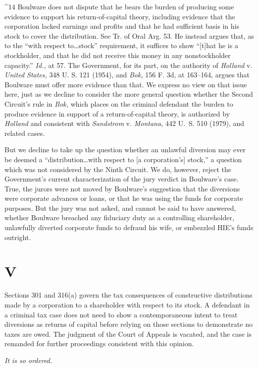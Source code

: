 ^14 Boulware does not dispute that he bears the burden of producing
some evidence to support his return-of-capital theory, including
evidence that the corporation lacked earnings and profits and that he
had sufficient basis in his stock to cover the distribution. See Tr.
of Oral Arg. 53. He instead argues that, as to the ``with respect
to\dots stock'' requirement, it suffices to show ``[t]hat he
is a stockholder, and that he did not receive this money in any
nonstockholder capacity.'' \emph{Id.,} at 57. The Government, for
its part, on the authority of \emph{Holland} v. \emph{United States,} 348
U. S. 121 (1954), and \emph{Bok,} 156 F. 3d, at 163--164, argues
that Boulware must offer more evidence than that. We express no view
on that issue here, just as we decline to consider the more general
question whether the Second Circuit's rule in \emph{Bok,} which places
on the criminal defendant the burden to produce evidence in support of
a return-of-capital theory, is authorized by \emph{Holland} and consistent
with \emph{Sandstrom} v. \emph{Montana,} 442 U.~S. 510 (1979), and
related cases.

  But we decline to take up the question whether an unlawful diversion
may ever be deemed a ``distribution\dots with respect to [a
corporation's] stock,'' a question which was not considered by
the Ninth Circuit. We do, however, reject the Government's current
characterization of the jury verdict in Boulware's case. True, the
jurors were not moved by Boulware's suggestion that the diversions
were corporate advances or loans, or that he was using the funds for
corporate purposes. But the jury was not asked, and cannot be said
to have answered, whether Boulware breached any fiduciary duty as a
controlling shareholder, unlawfully diverted corporate funds to defraud
his wife, or embezzled HIE's funds outright.

\section{V}

  Sections 301 and 316(a) govern the tax consequences of constructive
distributions made by a corporation to a shareholder with respect to
its stock. A defendant in a criminal tax case does not need to show a
contemporaneous intent to treat diversions as returns of capital before
relying on those sections to demonstrate no taxes are owed. The judgment
of the Court of Appeals is vacated, and the case is remanded for further
proceedings consistent with this opinion.

\begin{flushright}\emph{It is so ordered.}\end{flushright}
